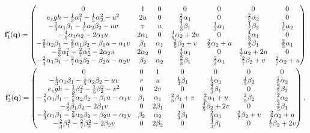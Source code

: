   \begin{gather}
    \mathbf{f}_1'(\mathbf{q}) =
    \begin{pmatrix}
      0 & 1 & 0 & 0 & 0 & 0 & 0 \\
      e_{z} g h - \frac{1}{3} \alpha_{1}^{2} - \frac{1}{5} \alpha_{2}^{2} - u^{2} & 2 u & 0 & \frac{2}{3} \alpha_{1} & 0 & \frac{2}{5} \alpha_{2} & 0 \\
      -\frac{1}{3} \alpha_{1} \beta_{1} - \frac{1}{5} \alpha_{2} \beta_{2} - u v & v & u & \frac{1}{3} \beta_{1} & \frac{1}{3} \alpha_{1} & \frac{1}{5} \beta_{2} & \frac{1}{5} \alpha_{2} \\
      -\frac{4}{5} \alpha_{1} \alpha_{2} - 2 \alpha_{1} u & 2 \alpha_{1} & 0 & \frac{4}{5} \alpha_{2} + 2 u & 0 & \frac{4}{5} \alpha_{1} & 0 \\
      -\frac{2}{5} \alpha_{2} \beta_{1} - \frac{2}{5} \alpha_{1} \beta_{2} - \beta_{1} u - \alpha_{1} v & \beta_{1} & \alpha_{1} & \frac{2}{5} \beta_{2} + v & \frac{2}{5} \alpha_{2} + u & \frac{2}{5} \beta_{1} & \frac{2}{5} \alpha_{1} \\
      -\frac{2}{3} \alpha_{1}^{2} - \frac{2}{7} \alpha_{2}^{2} - 2 \alpha_{2} u & 2 \alpha_{2} & 0 & \frac{4}{3} \alpha_{1} & 0 & \frac{4}{7} \alpha_{2} + 2 u & 0 \\
      -\frac{2}{3} \alpha_{1} \beta_{1} - \frac{2}{7} \alpha_{2} \beta_{2} - \beta_{2} u - \alpha_{2} v & \beta_{2} & \alpha_{2} & \frac{2}{3} \beta_{1} & \frac{2}{3} \alpha_{1} & \frac{2}{7} \beta_{2} + v & \frac{2}{7} \alpha_{2} + u
    \end{pmatrix} \\
    \mathbf{f}_2'(\mathbf{q}) =
    \begin{pmatrix}
      0 & 0 & 1 & 0 & 0 & 0 & 0 \\
      -\frac{1}{3} \alpha_{1} \beta_{1} - \frac{1}{5} \alpha_{2} \beta_{2} - u v & v & u & \frac{1}{3} \beta_{1} & \frac{1}{3} \alpha_{1} & \frac{1}{5} \beta_{2} & \frac{1}{5} \alpha_{2} \\
      e_{z} g h - \frac{1}{3} \beta_{1}^{2} - \frac{1}{5} \beta_{2}^{2} - v^{2} & 0 & 2 v & 0 & \frac{2}{3} \beta_{1} & 0 & \frac{2}{5} \beta_{2} \\
      -\frac{2}{5} \alpha_{1} \beta_{1} - \frac{2}{5} \alpha_{2} \beta_{2} - \beta_{1} u - \alpha_{1} v & \beta_{1} & \alpha_{1} & \frac{2}{5} \beta_{1} + v & \frac{2}{5} \alpha_{1} + u & \frac{2}{5} \beta_{2} & \frac{2}{5} \alpha_{2} \\
      -\frac{4}{5} \beta_{1} \beta_{2} - 2 \beta_{1} v & 0 & 2 \beta_{1} & 0 & \frac{4}{5} \beta_{2} + 2 v & 0 & \frac{4}{5} \beta_{1} \\
      -\frac{2}{3} \alpha_{1} \beta_{1} - \frac{2}{7} \alpha_{2} \beta_{2} - \beta_{2} u - \alpha_{2} v & \beta_{2} & \alpha_{2} & \frac{2}{3} \beta_{1} & \frac{2}{3} \alpha_{1} & \frac{2}{7} \beta_{2} + v & \frac{2}{7} \alpha_{2} + u \\
      -\frac{2}{3} \beta_{1}^{2} - \frac{2}{7} \beta_{2}^{2} - 2 \beta_{2} v & 0 & 2 \beta_{2} & 0 & \frac{4}{3} \beta_{1} & 0 & \frac{4}{7} \beta_{2} + 2 v
    \end{pmatrix}.
  \end{gather}
